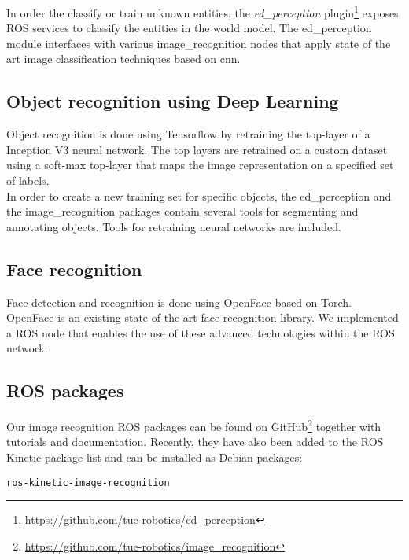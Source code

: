 In order the classify or train unknown entities, the \emph{ed\_perception} plugin\footnote{\url{https://github.com/tue-robotics/ed_perception}} exposes ROS services to classify the entities in the world model. The ed\_perception module interfaces with various image\_recognition nodes that apply state of the art image classification techniques based on \acrfull{cnn}.

\subsection{Object recognition using Deep Learning}
Object recognition is done using Tensorflow by retraining the top-layer of a Inception V3 neural network. The top layers are retrained on a custom dataset using a soft-max top-layer that maps the image representation on a specified set of labels.
\\
In order to create a new training set for specific objects, the ed\_perception and the image\_recognition packages contain several tools for segmenting and annotating objects. Tools for retraining neural networks are included.

\subsection{Face recognition}
Face detection and recognition is done using OpenFace based on Torch. OpenFace is an existing state-of-the-art face recognition library. We implemented a ROS node that enables the use of these advanced technologies within the ROS network.
\subsection{ROS packages}
Our image recognition ROS packages can be found on GitHub\footnote{\url{https://github.com/tue-robotics/image_recognition}} together with tutorials and documentation. Recently, they have also been added to the ROS Kinetic package list and can be installed as Debian packages:
\begin{lstlisting}
ros-kinetic-image-recognition
\end{lstlisting} 